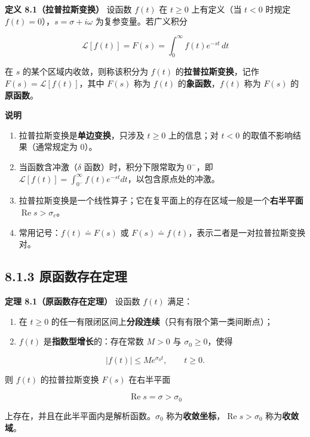 \textbf{定义 8.1（拉普拉斯变换）} 设函数 \(f(t)\) 在 \(t\ge 0\)
上有定义（当 \(t<0\) 时规定 \(f(t)=0\)），\(s=\sigma+i\omega\)
为复参变量。若广义积分

\[
\mathcal{L}[f(t)] = F(s) = \int_{0}^{\infty} f(t)e^{-st}\,dt
\]

在 \(s\) 的某个区域内收敛，则称该积分为 \(f(t)\)
的\textbf{拉普拉斯变换}，记作 \(F(s)=\mathcal{L}[f(t)]\)，其中 \(F(s)\)
称为 \(f(t)\) 的\textbf{象函数}，\(f(t)\) 称为 \(F(s)\)
的\textbf{原函数}。

\textbf{说明}

\begin{enumerate}
\def\labelenumi{\arabic{enumi}.}
\tightlist
\item
  拉普拉斯变换是\textbf{单边变换}，只涉及 \(t\ge 0\) 上的信息；对
  \(t<0\) 的取值不影响结果（通常规定为 \(0\)）。
\item
  当函数含冲激（\(\delta\) 函数）时，积分下限常取为 \(0^{-}\)，即
  \(\displaystyle\mathcal{L}[f(t)]=\int_{0^-}^{\infty} f(t)e^{-st}dt\)，以包含原点处的冲激。
\item
  拉普拉斯变换是一个线性算子；它在复平面上的存在区域一般是一个\textbf{右半平面}
  \(\operatorname{Re}s>\sigma_c\)。
\item
  常用记号：\(f(t)\doteq F(s)\) 或
  \(F(s)\doteq f(t)\)，表示二者是一对拉普拉斯变换对。
\end{enumerate}

\subsection{8.1.3
原函数存在定理}\label{ux539fux51fdux6570ux5b58ux5728ux5b9aux7406}

\textbf{定理 8.1（原函数存在定理）} 设函数 \(f(t)\) 满足：

\begin{enumerate}
\def\labelenumi{(\arabic{enumi})}
\item
  在 \(t\ge 0\)
  的任一有限闭区间上\textbf{分段连续}（只有有限个第一类间断点）；
\item
  \(f(t)\) 是\textbf{指数型增长}的：存在常数 \(M>0\) 与
  \(\sigma_0\ge 0\)，使得
\end{enumerate}

\[
|f(t)| \le M e^{\sigma_0 t},\qquad t\ge 0 .
\]

则 \(f(t)\) 的拉普拉斯变换 \(F(s)\) 在右半平面

\[
\operatorname{Re}s = \sigma > \sigma_0
\]

上存在，并且在此半平面内是解析函数。\(\sigma_0\)
称为\textbf{收敛坐标}，\(\operatorname{Re}s>\sigma_0\)
称为\textbf{收敛域}。

